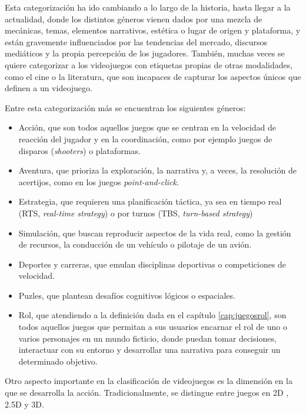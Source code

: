 \medskip

Esta categorización ha ido cambiando a lo largo de la historia, hasta llegar a la actualidad, donde los distintos géneros vienen dados por una mezcla de mecánicas, temas, elementos narrativos, estética o lugar de origen y plataforma, y están gravemente influenciados por las tendencias del mercado, discursos mediáticos y la propia percepción de los jugadores. También, muchas veces se quiere categorizar a los videojuegos con etiquetas propias de otras modalidades, como el cine o la literatura, que son incapaces de capturar los aspectos únicos que definen a un videojuego.

\smallskip

Entre esta categorización más  se encuentran los siguientes géneros:
\begin{itemize}
	\item Acción, que son todos aquellos juegos que se centran en la velocidad de reacción del jugador y en la coordinación, como por ejemplo juegos de disparos (\textit{shooters}) o plataformas.
	\item Aventura, que prioriza la exploración, la narrativa y, a veces, la resolución de acertijos, como en los juegos \textit{point-and-click}.
	\item Estrategia, que requieren una planificación táctica, ya sea en tiempo real (RTS, \textit{real-time strategy}) o por turnos (TBS, \textit{turn-based strategy})
	\item Simulación, que buscan reproducir aspectos de la vida real, como la gestión de recursos, la conducción de un vehículo o pilotaje de un avión.
	\item Deportes y carreras, que emulan disciplinas deportivas o competiciones de velocidad.
	\item Puzles, que plantean desafíos cognitivos lógicos o espaciales.
	\item Rol, que atendiendo a la definición dada en el capítulo \ref{cap:juegosrol}, son todos aquellos juegos que permitan a sus usuarios encarnar el rol de uno o varios personajes en un mundo ficticio, donde puedan tomar decisiones, interactuar con su entorno y desarrollar una narrativa para conseguir un determinado objetivo.
\end{itemize}

\medskip

Otro aspecto importante en la clasificación de videojuegos es la dimensión en la que se desarrolla la acción. Tradicionalmente, se distingue entre juegos en 2D , 2.5D y 3D.

